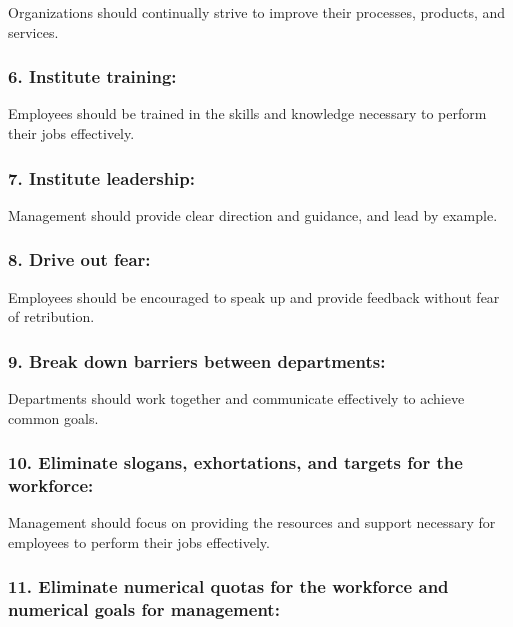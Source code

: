 \documentclass[11pt]{article}
\begin{document}
Organizations should continually strive to improve their processes,
products, and services.

\hypertarget{institute-training}{%
\subsubsection{6. Institute training:}\label{institute-training}}

Employees should be trained in the skills and knowledge necessary to
perform their jobs effectively.

\hypertarget{institute-leadership}{%
\subsubsection{7. Institute leadership:}\label{institute-leadership}}

Management should provide clear direction and guidance, and lead by
example.

\hypertarget{drive-out-fear}{%
\subsubsection{8. Drive out fear:}\label{drive-out-fear}}

Employees should be encouraged to speak up and provide feedback without
fear of retribution.

\hypertarget{break-down-barriers-between-departments}{%
\subsubsection{9. Break down barriers between
departments:}\label{break-down-barriers-between-departments}}

Departments should work together and communicate effectively to achieve
common goals.

\hypertarget{eliminate-slogans-exhortations-and-targets-for-the-workforce}{%
\subsubsection{10. Eliminate slogans, exhortations, and targets for the
workforce:}\label{eliminate-slogans-exhortations-and-targets-for-the-workforce}}

Management should focus on providing the resources and support necessary
for employees to perform their jobs effectively.

\hypertarget{eliminate-numerical-quotas-for-the-workforce-and-numerical-goals-for-management}{%
\subsubsection{11. Eliminate numerical quotas for the workforce and
numerical goals for
management:}\label{eliminate-numerical-quotas-for-the-workforce-and-numerical-goals-for-management}}
\end{document}

